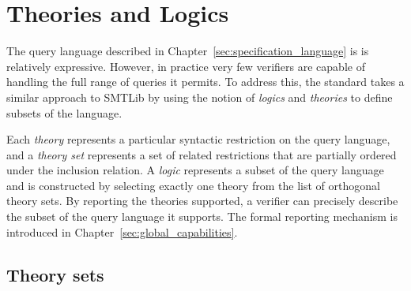    

\chapter{Theories and Logics}
\label{sec:theories-logics}

The query language described in Chapter~\ref{sec:specification_language} is is relatively expressive. However, in practice very few verifiers are capable of handling the full range of queries it permits.  To address this, the \vnnlib{} standard takes a similar approach to SMTLib by using the notion of \emph{logics} and \emph{theories} to define subsets of the language.

Each \emph{theory} represents a particular syntactic restriction on the query language, and a \emph{theory set} represents a set of related restrictions that are partially ordered under the inclusion relation. A \emph{logic} represents a subset of the query language and is constructed by selecting exactly one theory from the list of orthogonal theory sets. 
By reporting the theories supported, a verifier can precisely describe the subset of the query language it supports. The formal reporting mechanism is introduced in Chapter~\ref{sec:global_capabilities}.

\section{Theory sets}

